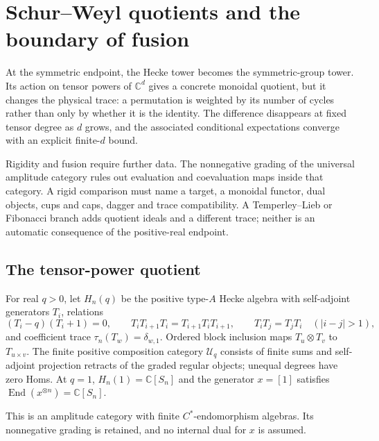 \clearpage
\section{Schur--Weyl quotients and the boundary of fusion}
\label{sec:f1-limit-schur}

At the symmetric endpoint, the Hecke tower becomes the symmetric-group
tower.  Its action on tensor powers of $\mathbb C^d$ gives a concrete
monoidal quotient, but it changes the physical trace: a permutation is
weighted by its number of cycles rather than only by whether it is the
identity.  The difference disappears at fixed tensor degree as $d$ grows,
and the associated conditional expectations converge with an explicit
finite-$d$ bound.

Rigidity and fusion require further data.  The nonnegative grading of the
universal amplitude category rules out evaluation and coevaluation maps
inside that category.  A rigid comparison must name a target, a monoidal
functor, dual objects, cups and caps, dagger and trace compatibility.  A
Temperley--Lieb or Fibonacci branch adds quotient ideals and a different
trace; neither is an automatic consequence of the positive-real endpoint.

\subsection{The tensor-power quotient}

\begin{definition}
For real $q>0$, let $H_n(q)$ be the positive type-$A$ Hecke algebra with
self-adjoint generators $T_i$, relations
\[
 (T_i-q)(T_i+1)=0,\qquad
 T_iT_{i+1}T_i=T_{i+1}T_iT_{i+1},\qquad
 T_iT_j=T_jT_i\quad(|i-j|>1),
\]
and coefficient trace $\tau_n(T_w)=\delta_{w,1}$.  Ordered block inclusion
maps $T_u\otimes T_v$ to $T_{u\times v}$.  The finite positive composition
category $\mathcal U_q$ consists of finite sums and self-adjoint projection
retracts of the graded regular objects; unequal degrees have zero Homs.  At
$q=1$, $H_n(1)=\mathbb C[S_n]$ and the generator $x=[1]$ satisfies
$\operatorname{End}(x^{\otimes n})=\mathbb C[S_n]$.
\end{definition}
\begin{scope}
This is an amplitude category with finite $C^*$-endomorphism algebras.  Its
nonnegative grading is retained, and no internal dual for $x$ is assumed.
\end{scope}

